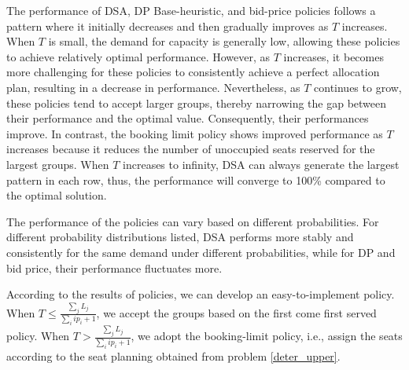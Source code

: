 The performance of DSA, DP Base-heuristic, and bid-price policies follows a pattern where it initially decreases and then gradually improves as $T$ increases. When $T$ is small, the demand for capacity is generally low, allowing these policies to achieve relatively optimal performance. However, as $T$ increases, it becomes more challenging for these policies to consistently achieve a perfect allocation plan, resulting in a decrease in performance. Nevertheless, as $T$ continues to grow, these policies tend to accept larger groups, thereby narrowing the gap between their performance and the optimal value. Consequently, their performances improve. In contrast, the booking limit policy shows improved performance as $T$ increases because it reduces the number of unoccupied seats reserved for the largest groups. When $T$ increases to infinity, DSA can always generate the largest pattern in each row, thus, the performance will converge to 100\% compared to the optimal solution.

The performance of the policies can vary based on different probabilities. For different probability distributions listed, DSA performs more stably and consistently for the same demand under different probabilities, while for DP and bid price, their performance fluctuates more.

According to the results of policies, we can develop an easy-to-implement policy. When $T \leq \frac{\sum_{j}{L_j}}{\sum_{i} i p_i + 1}$, we accept the groups based on the first come first served policy.
When $T > \frac{\sum_{j}{L_j}}{\sum_{i} i p_i + 1}$, we adopt the booking-limit policy, i.e., assign the seats according to the seat planning obtained from problem \ref{deter_upper}.



